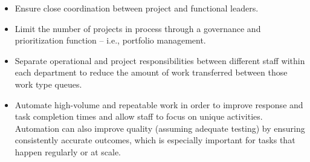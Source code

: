 \documentclass[conference]{IEEEtran}
\begin{document}
\begin{itemize}
\item Ensure close coordination between project and functional leaders. %

\item Limit the number of projects in process through a governance and prioritization function -- i.e., portfolio management. %

\item Separate operational and project responsibilities between different staff within each department to reduce the amount of work transferred between those work type queues. %



\item Automate high-volume and repeatable work in order to improve response and task completion times and allow staff to focus on unique activities. Automation can also improve quality (assuming adequate testing) by ensuring consistently accurate outcomes, which is especially important for tasks that happen regularly or at scale. %

\end{itemize}
\end{document}
